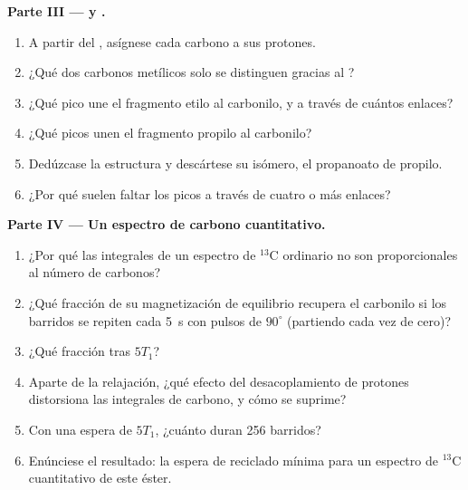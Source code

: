 \begin{problem}
\medskip\noindent\textbf{Parte III ---  y .}
\begin{enumerate}[resume]
  \item A partir del , asígnese cada carbono a sus protones.
  \item ¿Qué dos carbonos metílicos solo se distinguen gracias al ?
  \item ¿Qué pico  une el fragmento etilo al carbonilo, y a través de
        cuántos enlaces?
  \item ¿Qué picos  unen el fragmento propilo al carbonilo?
  \item Dedúzcase la estructura y descártese su isómero, el propanoato de propilo.
  \item ¿Por qué suelen faltar los picos  a través de cuatro o más enlaces?
\end{enumerate}

\medskip\noindent\textbf{Parte IV --- Un espectro de carbono cuantitativo.}
\begin{enumerate}[resume]
  \item ¿Por qué las integrales de un espectro de ${}^{13}$C ordinario no son proporcionales al
        número de carbonos?
  \item ¿Qué fracción de su magnetización de equilibrio recupera el carbonilo
        si los barridos se repiten cada \qty{5}{s} con pulsos de $90^\circ$ (partiendo cada vez
        de cero)?
  \item ¿Qué fracción tras $5T_1$?
  \item Aparte de la relajación, ¿qué efecto del desacoplamiento de protones distorsiona las integrales
        de carbono, y cómo se suprime?
  \item Con una espera de $5T_1$, ¿cuánto duran 256 barridos?
  \item Enúnciese el resultado: la espera de reciclado mínima para un espectro de ${}^{13}$C
        cuantitativo de este éster.
\end{enumerate}
\end{problem}
